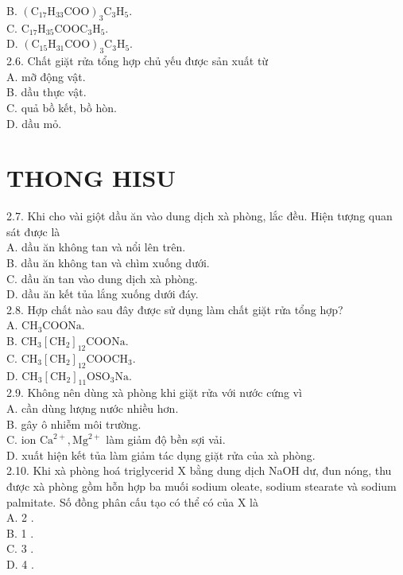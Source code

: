 \documentclass[10pt]{article}
\begin{document}
B. $\left(\mathrm{C}_{17} \mathrm{H}_{33} \mathrm{COO}\right)_{3} \mathrm{C}_{3} \mathrm{H}_{5}$.\\
C. $\mathrm{C}_{17} \mathrm{H}_{35} \mathrm{COOC}_{3} \mathrm{H}_{5}$.\\
D. $\left(\mathrm{C}_{15} \mathrm{H}_{31} \mathrm{COO}\right)_{3} \mathrm{C}_{3} \mathrm{H}_{5}$.\\
2.6. Chất giặt rửa tổng hợp chủ yếu được sản xuất từ\\
A. mỡ động vật.\\
B. dầu thực vật.\\
C. quả bồ kết, bồ hòn.\\
D. dầu mỏ.

\section*{THONG HISU}
2.7. Khi cho vài giột dầu ăn vào dung dịch xà phòng, lắc đều. Hiện tượng quan sát được là\\
A. dầu ăn không tan và nổi lên trên.\\
B. dầu ăn không tan và chìm xuống dưới.\\
C. dầu ăn tan vào dung dịch xà phòng.\\
D. dầu ăn kết tủa lắng xuống dưới đáy.\\
2.8. Hợp chất nào sau đây được sử dụng làm chất giặt rửa tổng hợp?\\
A. $\mathrm{CH}_{3} \mathrm{COONa}$.\\
B. $\mathrm{CH}_{3}\left[\mathrm{CH}_{2}\right]_{12} \mathrm{COONa}$.\\
C. $\mathrm{CH}_{3}\left[\mathrm{CH}_{2}\right]_{12} \mathrm{COOCH}_{3}$.\\
D. $\mathrm{CH}_{3}\left[\mathrm{CH}_{2}\right]_{11} \mathrm{OSO}_{3} \mathrm{Na}$.\\
2.9. Không nên dùng xà phòng khi giặt rửa với nước cứng vì\\
A. cần dùng lượng nước nhiều hơn.\\
B. gây ô nhiễm môi trường.\\
C. ion $\mathrm{Ca}^{2+}, \mathrm{Mg}^{2+}$ làm giảm độ bền sợi vải.\\
D. xuất hiện kết tủa làm giảm tác dụng giặt rửa của xà phòng.\\
2.10. Khi xà phòng hoá triglycerid X bằng dung dịch NaOH dư, đun nóng, thu được xà phòng gồm hỗn hợp ba muối sodium oleate, sodium stearate và sodium palmitate. Số đồng phân cấu tạo có thể có của X là\\
A. 2 .\\
B. 1 .\\
C. 3 .\\
D. 4 .
\end{document}
